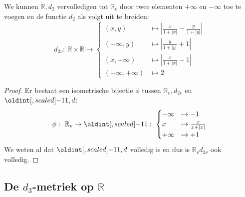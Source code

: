 \documentclass[main.tex]{subfiles}
\begin{document}
\begin{vb}
  We kunnen $\mathbb{R},d_{2}$ vervolledigen tot $\mathbb{R}_{v}$ door twee elementen $+\infty$ en $-\infty$ toe te voegen en de functie $d_{2}$ als volgt uit te breiden:
  \[ d_{2v}:\ \mathbb{R}\times\mathbb{R}\rightarrow
  \begin{cases}
    (x,y) &\mapsto \left| \frac{x}{1+|x|} - \frac{y}{1+|y|}  \right| \\
    (-\infty,y) &\mapsto \left| \frac{y}{1+|y|} +1\right|\\
    (x,+\infty) &\mapsto \left| \frac{x}{1+|x|} -1\right|\\
    (-\infty,+\infty) &\mapsto 2
  \end{cases}
  \]

  \begin{proof}
    Er bestaat een isometrische bijectie $\phi$ tussen $\mathbb{R}_{v},d_{2v}$ en $\interval{-1}{1},d$:
    \[
    \phi:\ \mathbb{R}_{v} \rightarrow \interval{-1}{1}:\ 
    \begin{cases}
      -\infty &\mapsto -1\\
      x &\mapsto \frac{x}{x+|x|}\\
      +\infty &\mapsto +1\\
    \end{cases}
    \]
    We weten al dat $\interval{-1}{1},d$ volledig is en dus is $\mathbb{R}_{v}d_{2v}$ ook volledig.
  \end{proof}
\end{vb}



\subsection{De $d_3$-metriek op $\mathbb{R}$}
\label{sec:d_3-metriek-op}
\end{document}
